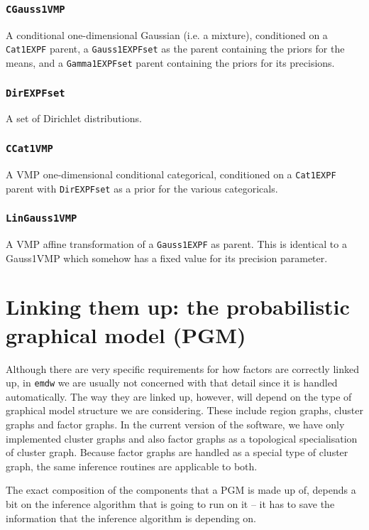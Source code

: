 \documentclass[english]{article}
\begin{document}
\subsubsection{\texttt{CGauss1VMP}}
A conditional one-dimensional Gaussian (i.e. a mixture), conditioned
on a \texttt{Cat1EXPF} parent, a \texttt{Gauss1EXPFset} as the parent
containing the priors for the means, and a \texttt{Gamma1EXPFset}
parent containing the priors for its precisions.

\subsubsection{\texttt{DirEXPFset}}
A set of Dirichlet distributions.

\subsubsection{\texttt{CCat1VMP}}
A VMP one-dimensional conditional categorical, conditioned on a
\texttt{Cat1EXPF} parent with \texttt{DirEXPFset} as a prior for the
various categoricals.

\subsubsection{\texttt{LinGauss1VMP}}
A VMP affine transformation of a \texttt{Gauss1EXPF} as parent. This
is identical to a Gauss1VMP which somehow has a fixed value for its
precision parameter.

\section{Linking them up: the probabilistic graphical model (PGM)} \label{sec:PGMs}

Although there are very specific requirements for how factors are
correctly linked up, in \texttt{emdw} we are usually not concerned with that
detail since it is handled automatically. The way they are linked up,
however, will depend on the type of graphical model structure we are
considering. These include region graphs, cluster graphs and factor
graphs. In the current version of the software, we have only
implemented cluster graphs and also factor graphs as a topological
specialisation of cluster graph. Because factor graphs are handled as
a special type of cluster graph, the same inference routines are
applicable to both.

The exact composition of the components that a PGM is made up of,
depends a bit on the inference algorithm that is going to run on it --
it has to save the information that the inference algorithm is
depending on.
\end{document}
